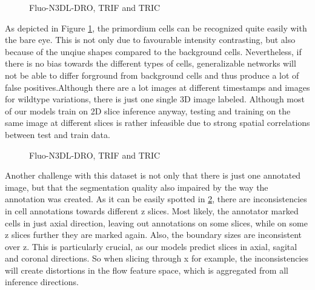 \begin{figure}[!ht]
    \centering
    \caption{Fluo-N3DL-DRO, TRIF and TRIC}
    \label{fig:ZebrafishVol}
\end{figure}

As depicted in Figure \ref{fig:ZebrafishVol}, the primordium cells can be recognized quite easily with the bare eye. This is not only due to favourable intensity contrasting, but also because of the unqiue shapes compared to the background cells. Nevertheless, if there is no bias towards the different types of cells, generalizable networks will not be able to differ forground from background cells and thus produce a lot of false positives.Although there are a lot images at different timestamps and images for wildtype variations, there is just one single 3D image labeled. Although most of our models train on 2D slice inference anyway, testing and training on the same image at different slices is rather infeasible due to strong spatial correlations between test and train data.

\begin{figure}[!ht]
    \centering
    \caption{Fluo-N3DL-DRO, TRIF and TRIC}
    \label{fig:ZebrafishAnnotations3d}
\end{figure}

Another challenge with this dataset is not only that there is just one annotated image, but that the segmentation quality also impaired by the way the annotation was created. As it can be easily spotted in \ref{fig:ZebrafishAnnotations3d}, there are inconsistencies in cell annotations towards different z slices. Most likely, the annotator marked cells in just axial direction, leaving out annotations on some slices, while on some z slices further they are marked again. Also, the boundary sizes are inconsistent over z. This is particularly crucial, as our models predict slices in axial, sagital and coronal directions. So when slicing through x for example, the inconsistencies will create distortions in the flow feature space, which is aggregated from all inference directions.



